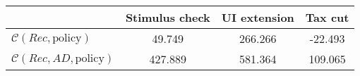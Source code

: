 \begin{tabular}{@{}lccc@{}} 
\toprule 
                          & Stimulus check      & UI extension    & Tax cut    \\  \midrule 
$\mathcal{C}(Rec,\text{policy})$ & 49.749  & 266.266  & -22.493     \\ 
$\mathcal{C}(Rec, AD,\text{policy})$ & 427.889  & 581.364  & 109.065     \\ 
\end{tabular}  
